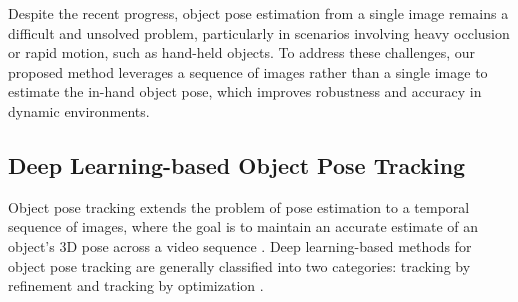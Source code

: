 Despite the recent progress, object pose estimation from a single image remains a difficult and unsolved problem, particularly in scenarios involving heavy occlusion or rapid motion, such as hand-held objects. To address these challenges, our proposed method leverages a sequence of images rather than a single image to estimate the in-hand object pose, which improves robustness and accuracy in dynamic environments.

\subsection{Deep Learning-based Object Pose Tracking}

Object pose tracking extends the problem of pose estimation to a temporal sequence of images, where the goal is to maintain an accurate estimate of an object's 3D pose across a video sequence \cite{sun2021robust, huang2021pixel, stoiber2020sparse, tian2022large}. Deep learning-based methods for object pose tracking are generally classified into two categories: tracking by refinement \cite{garon2017deep, marougkas2020track, manhardt2018deep, li2018deepim, dosovitskiy2015flownet, wen2020se} and tracking by optimization \cite{deng2021poserbpf, majcher20203d, zhong2020seeing, wang2023deep}.

